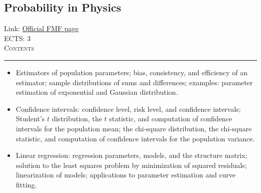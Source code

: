 \documentclass[11pt, a4paper]{article}
\newenvironment{course}[3]{
\subsection{#1}%
Link: \href{#2}{Official FMF page}\\%
ECTS: #3%
\vspace{1ex}
\\
{\large \textsc{Contents}}\\[-0.9ex]%
\rule{\textwidth}{0.5pt}
\vspace{-3ex}
}
{}
\newenvironment{chapter}[1]{
\begin{tcolorbox}[title=#1, breakable]
}
{\end{tcolorbox}}
\begin{document}
\begin{course}{Probability in Physics}{https://www.fmf.uni-lj.si/en/study-physics/programmes/1fiz/2020/7000777/courses/1177/}{3}
\begin{chapter}{Introduction to statistics}
\begin{itemize}
            \item Estimators of population parameters; bias, consistency, and efficiency of an estimator;
            sample distributions of sums and differences; examples: parameter estimation of exponential and Gaussian distribution.

            \item Confidence intervals: confidence level, risk level, and confidence intervals; Student's $ t $ distribution, the $ t $ statistic, and computation of confidence intervals for the population mean; the chi-square distribution, the chi-square statistic, and computation of confidence intervals for the population variance.

            \item Linear regression: regression parameters, models, and the structure matrix; solution to the least squares problem by minimization of squared residuals; linearization of models; applications to parameter estimation and curve fitting.
        
        \end{itemize}
    \end{chapter}
\end{course}
\end{document}
